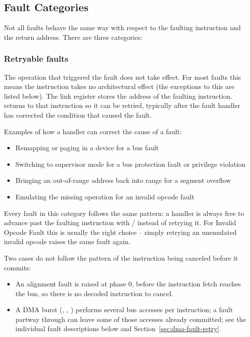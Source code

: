 \subsection{Fault Categories}
\label{sec:fault-categories}

Not all faults behave the same way with respect to the faulting instruction and the  return address.
There are three categories:

\subsubsection{Retryable faults}
The operation that triggered the fault does not take effect. For most faults this means the instruction takes no
architectural effect (the exceptions to this are listed below). The link register stores the address of the faulting
instruction.  returns to that instruction so it can be retried, typically after the fault handler has
corrected the condition that caused the fault.

Examples of how a handler can correct the cause of a fault:

\begin{itemize}
	\item Remapping or paging in a device for a bus fault
	\item Switching to supervisor mode for a bus protection fault or privilege violation
	\item Bringing an out-of-range address back into range for a segment overflow
	\item Emulating the missing operation for an invalid opcode fault
\end{itemize}

Every fault in this category follows the same pattern: a handler is always free to advance past the faulting
instruction with / instead of retrying it. For Invalid Opcode Fault this is usually the
right choice -- simply retrying an unemulated invalid opcode raises the same fault again.

Two cases do not follow the pattern of the instruction being canceled before it commits:

\begin{itemize}
	\item An alignment fault is raised at phase 0, before the instruction fetch reaches the bus, so there is no decoded
	      instruction to cancel.
	\item A DMA burst (, , ) performs several bus accesses per instruction; a fault
	      partway through can leave some of those accesses already committed; see the individual fault descriptions below and
	      Section~\ref{sec:dma-fault-retry}.
\end{itemize}

